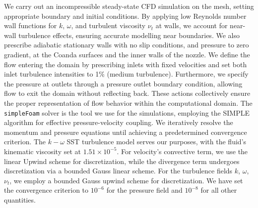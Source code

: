 We carry out an incompressible steady-state CFD simulation on the mesh, setting appropriate boundary and initial conditions. By applying low Reynolds number wall functions for $k$, $\omega$, and turbulent viscosity $\nu_t$ at walls, we account for near-wall turbulence effects, ensuring accurate modelling near boundaries. We also prescribe adiabatic stationary walls with no slip conditions, and pressure to zero gradient, at the Coanda surfaces and the inner walls of the nozzle. We define the flow entering the domain by prescribing inlets with fixed velocities and set both inlet turbulence intensities to 1\% (medium turbulence). Furthermore, we specify the pressure at outlets through a pressure outlet boundary condition, allowing flow to exit the domain without reflecting back. These actions collectively ensure the proper representation of flow behavior within the computational domain. The \verb|simpleFoam| solver is the tool we use for the simulations, employing the \gls{SIMPLE} algorithm for effective pressure-velocity coupling. We iteratively resolve the momentum and pressure equations until achieving a predetermined convergence criterion. The $k-\omega$ SST turbulence model serves our purposes, with the fluid's kinematic viscosity set at $1.51 \times {10}^{-5}$. For velocity's convective term, we use the linear Upwind scheme for discretization, while the divergence term undergoes discretization via a bounded Gauss linear scheme. For the turbulence fields $k$, $\omega$, $\nu_t$, we employ a bounded Gauss upwind scheme for discretization. We have set the convergence criterion to ${10}^{-6}$ for the pressure field and ${10}^{-8}$ for all other quantities.

